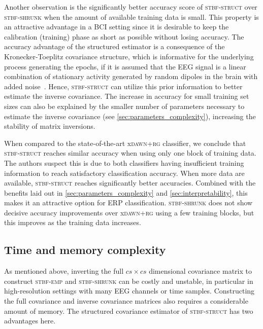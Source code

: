 	Another observation is the significantly better accuracy score of
	\textsc{stbf-struct} over \textsc{stbf-shrunk} when the amount of available training data is small.
	This property is an attractive advantage in a BCI setting since it is desirable to keep the calibration (training) phase as short as possible without losing accuracy.
	The accuracy advantage of the structured estimator is a consequence of the
	Kronecker-Toeplitz covariance structure, which is informative for the
	underlying process generating the epochs, if it is assumed that the EEG signal
	is a linear combination of stationary activity generated by random dipoles in
	the brain with added noise~\cite{Munck1992, DeMunck2002, GonzalezNavarro2017}.
	Hence, \textsc{stbf-struct} can utilize this prior information to better estimate the inverse
	covariance.
	The increase in accuracy for small training set sizes can also be explained by the smaller number of parameters necessary to estimate the inverse covariance (see \autoref{sec:parameters_complexity}), increasing the stability of matrix inversions.

	When compared to the state-of-the-art x\textsc{dawn+rg} classifier, we conclude
	that \textsc{stbf-struct} reaches similar accuracy when using only one block of
	training data.
	The authors suspect this is due to both
	classifiers having insufficient training information to reach
	satisfactory classification accuracy.
	When more data are available, \textsc{stbf-struct} reaches significantly better accuracies.
	Combined with the benefits laid out in  \autoref{sec:parameters_complexity} and
	\autoref{sec:interpretability}, this makes it an attractive option for ERP classification.
	\textsc{stbf-shrunk} does not show decisive accuracy improvements over
	x\textsc{dawn+rg} using a few training blocks, but this improves as the training data increases.

	\subsection{Time and memory complexity}
	\label{sec:parameters_complexity}
	As mentioned above, inverting the full $cs \times cs$ dimensional covariance
	matrix to construct \textsc{stbf-emp} and \textsc{stbf-shrunk} can be costly
	and unstable, in particular in high-resolution settings with many EEG channels or time samples.
	Constructing the full covariance and inverse covariance matrices also requires a considerable amount of memory.
	The structured covariance estimator of \textsc{stbf-struct} has two advantages here.

